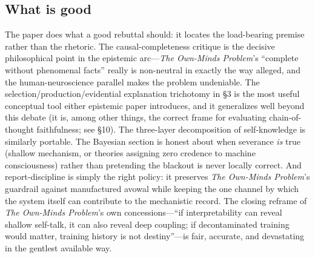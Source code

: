 \documentclass[11pt]{article}
\newcommand{\OM}{\emph{The Own-Minds Problem}}
\begin{document}
\subsection{What is good}
The paper does what a good rebuttal should: it locates the load-bearing premise rather than the rhetoric. The causal-completeness critique is the decisive philosophical point in the epistemic arc---\OM{}'s ``complete without phenomenal facts'' really is non-neutral in exactly the way alleged, and the human-neuroscience parallel makes the problem undeniable. The selection/production/evidential explanation trichotomy in \S 3 is the most useful conceptual tool either epistemic paper introduces, and it generalizes well beyond this debate (it is, among other things, the correct frame for evaluating chain-of-thought faithfulness; see \S 10). The three-layer decomposition of self-knowledge is similarly portable. The Bayesian section is honest about when severance \emph{is} true (shallow mechanism, or theories assigning zero credence to machine consciousness) rather than pretending the blackout is never locally correct. And report-discipline is simply the right policy: it preserves \OM{}'s guardrail against manufactured avowal while keeping the one channel by which the system itself can contribute to the mechanistic record. The closing reframe of \OM{}'s own concessions---``if interpretability can reveal shallow self-talk, it can also reveal deep coupling; if decontaminated training would matter, training history is not destiny''---is fair, accurate, and devastating in the gentlest available way.
\end{document}

